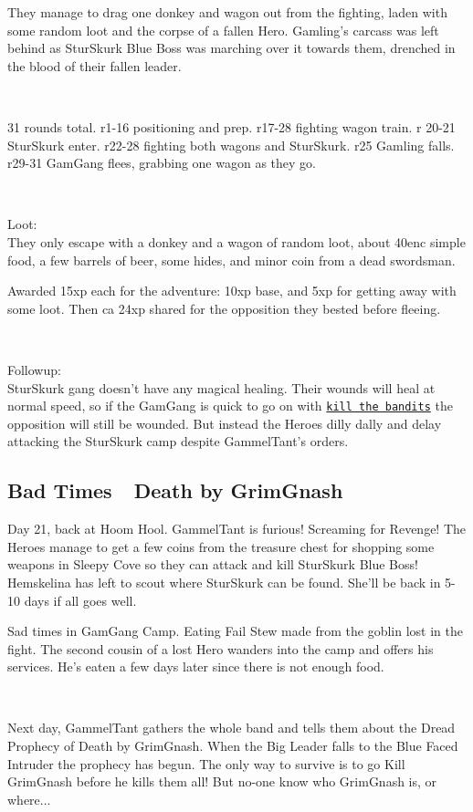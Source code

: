 They manage to drag one donkey and wagon out from the fighting, laden with some random loot and the corpse of a fallen Hero. Gamling's carcass was left behind as SturSkurk Blue Boss was marching over it towards them, drenched in the blood of their fallen leader.

\

31 rounds total. r1-16 positioning and prep. r17-28 fighting wagon train. r 20-21 SturSkurk enter. r22-28 fighting both wagons and SturSkurk. r25 Gamling falls. r29-31 GamGang flees, grabbing one wagon as they go.

\

Loot:\\
They only escape with a donkey and a wagon of random loot, about 40enc simple food, a few barrels of beer, some hides, and minor coin from a dead swordsman.

Awarded 15xp each for the adventure: 10xp base, and 5xp for getting away with some loot. Then ca 24xp shared for the opposition they bested before fleeing.

\

Followup:\\
SturSkurk gang doesn't have any magical healing. Their wounds will heal at normal speed, so if the GamGang is quick to go on with \hyperref[02killthebandits]{\texttt{kill the bandits}} the opposition will still be wounded. But instead the Heroes dilly dally and delay attacking the SturSkurk camp despite GammelTant's orders.


\subsection*{Bad Times~\mdash~Death by GrimGnash}

Day 21, back at Hoom Hool. GammelTant is furious! Screaming for Revenge! The Heroes manage to get a few coins from the treasure chest for shopping some weapons in Sleepy Cove so they can attack and kill SturSkurk Blue Boss! Hemskelina has left to scout where SturSkurk can be found. She'll be back in 5-10 days if all goes well.

Sad times in GamGang Camp. Eating Fail Stew made from the goblin lost in the fight. The second cousin of a lost Hero wanders into the camp and offers his services. He's eaten a few days later since there is not enough food.

\

Next day, GammelTant gathers the whole band and tells them about the Dread Prophecy of Death by GrimGnash. When the Big Leader falls to the Blue Faced Intruder the prophecy has begun. The only way to survive is to go Kill GrimGnash before he kills them all! But no-one know who GrimGnash is, or where...


